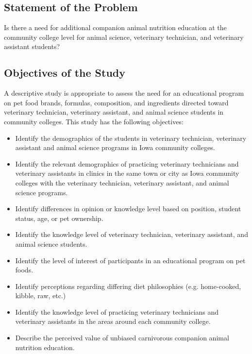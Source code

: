 \subsection{Statement of the Problem}

Is there a need for additional companion animal nutrition education at the community college level for animal science, veterinary technician, and veterinary assistant students?

\subsection{Objectives of the Study}

A descriptive study is appropriate to assess the need for an educational program on pet food brands, formulas, composition, and ingredients directed toward veterinary technician, veterinary assistant, and animal science students in community colleges.  This study has the following objectives:
\begin{itemize}
    \item Identify the demographics of the students in veterinary technician, veterinary assistant and animal science programs in Iowa community colleges.
    \item Identify the relevant demographics of practicing veterinary technicians and veterinary assistants in clinics in the same town or city as Iowa community colleges with the veterinary technician, veterinary assistant, and animal science programs.
    \item Identify differences in opinion or knowledge level based on position, student status, age, or pet ownership.
    \item Identify the knowledge level of veterinary technician, veterinary assistant, and animal science students.
    \item Identify the level of interest of participants in an educational program on pet foods.
    \item Identify perceptions regarding differing diet philosophies (e.g. home-cooked, kibble, raw, etc.)
    \item Identify the knowledge level of practicing veterinary technicians and veterinary assistants in the areas around each community college.
    \item Describe the perceived value of unbiased carnivorous companion animal nutrition education.
\end{itemize}

